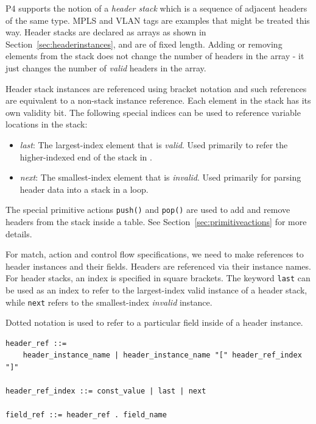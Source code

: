 \documentclass[12pt]{article}
\begin{document}
P4 supports the notion of a \textit{header stack} which is a sequence of
adjacent headers of the same type. MPLS and VLAN tags are examples that might
be treated this way.  Header stacks are declared as arrays as shown in
Section~\ref{sec:headerinstances}, and are of fixed length. Adding or removing
elements from the stack does not change the number of headers in the array - it
just changes the number of \textit{valid} headers in the array.

Header stack instances are referenced using bracket notation and such
references are equivalent to a non-stack instance reference. Each
element in the stack has its own validity bit. The following special
indices can be used to reference variable locations in the stack:

\begin{itemize}
\item
\textit{last}: The largest-index element that is \textit{valid}.
Used primarily to refer the higher-indexed end of the stack in \matchaction.
\item
\textit{next}: The smallest-index element that is \textit{invalid}.
Used primarily for parsing header data into a stack in a loop.
\end{itemize}

The special primitive actions \texttt{push()} and \texttt{pop()} are used to add 
and remove headers from the stack inside a \matchaction table. See Section~\ref{sec:primitiveactions} 
for more details.


For match, action and control flow specifications, we need to make
references to header instances and their fields. Headers are
referenced via their instance names.  For header stacks, an index is
specified in square brackets. The keyword \texttt{last} can be used as an
index to refer to the largest-index valid instance of a header stack, while
\texttt{next} refers to the smallest-index \textit{invalid} instance.

Dotted notation is used to refer to a particular field inside of a header
instance. 

\begin{lstlisting}[style=BNFstyle]
header_ref ::=
    header_instance_name | header_instance_name "[" header_ref_index "]"

header_ref_index ::= const_value | last | next

field_ref ::= header_ref . field_name
\end{lstlisting}
\end{document}

